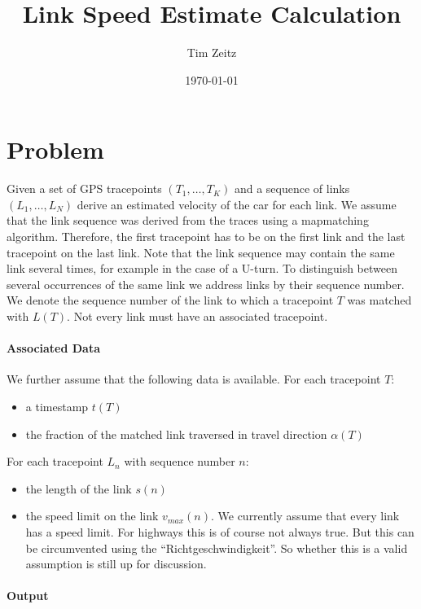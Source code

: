 \documentclass{scrartcl}
\title{Link Speed Estimate Calculation}
\author{Tim Zeitz}
\date{\today}
\begin{document}
\maketitle
\tableofcontents
\section{Problem}

Given a set of GPS tracepoints $(T_1, \dots, T_K)$ and a sequence of links $(L_1, \dots, L_N)$ derive an estimated velocity of the car for each link.
We assume that the link sequence was derived from the traces using a mapmatching algorithm.
Therefore, the first tracepoint has to be on the first link and the last tracepoint on the last link.
Note that the link sequence may contain the same link several times, for example in the case of a U-turn.
To distinguish between several occurrences of the same link we address links by their sequence number.
We denote the sequence number of the link to which a tracepoint $T$ was matched with $L(T)$.
Not every link must have an associated tracepoint.

\paragraph{Associated Data}

We further assume that the following data is available.
For each tracepoint $T$:

\begin{itemize}
  \item a timestamp $t(T)$
  \item the fraction of the matched link traversed in travel direction $\alpha(T)$
\end{itemize}

For each tracepoint $L_n$ with sequence number $n$:
\begin{itemize}
  \item the length of the link $s(n)$
  \item the speed limit on the link $v_{max}(n)$.
    We currently assume that every link has a speed limit.
    For highways this is of course not always true.
    But this can be circumvented using the ``Richtgeschwindigkeit''.
    So whether this is a valid assumption is still up for discussion.
\end{itemize}

\paragraph{Output}
\end{document}
